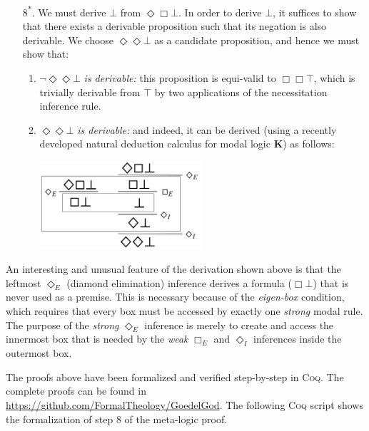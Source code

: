 \documentclass{llncs}
\newcommand{\logic}[1]{\textbf{#1}\xspace}
\newcommand{\K}{\logic{K}}
\newcommand{\Dia}{\Diamond} %
\newcommand{\nec}{\Box}
\newcommand{\pos}{\Dia}
\begin{document}
\begin{enumerate}
\item[8\textsuperscript{*}.] We must derive $\bot$ from $\pos \nec \bot$. In order to derive $\bot$, it suffices to show that there exists a derivable proposition such that its negation is also derivable. We choose $\pos \pos \bot$ as a candidate proposition, and hence we must show that:
\begin{enumerate}
\item $\neg \pos \pos \bot$ \emph{is derivable:} this proposition is equi-valid to $\nec \nec \top$, which is trivially derivable from $\top$ by two applications of the necessitation inference rule.

\item $\pos \pos \bot$ \emph{is derivable:} and indeed, it can be derived (using a recently developed natural deduction calculus for modal logic \K \cite{CSR}) as follows:
\smallskip
\begin{center}
\includegraphics[width=0.5\textwidth]{Derivation}
\end{center}
\smallskip

\end{enumerate}

\end{enumerate}

An interesting and unusual feature of the derivation shown above is that the leftmost $\pos_E$ (diamond elimination) inference derives a formula ($\nec \bot$) that is never used as a premise. This is necessary because of the \emph{eigen-box} condition, which requires that every box must be accessed by exactly one \emph{strong} modal rule. The purpose of the \emph{strong} $\pos_E$ inference is merely to create and access the innermost box that is needed by the \emph{weak} $\nec_E$ and $\pos_I$ inferences inside the outermost box.

The proofs above have been formalized and verified step-by-step in \textsc{Coq}. The complete proofs can be found in \url{https://github.com/FormalTheology/GoedelGod}. The following \textsc{Coq} script shows the formalization of step 8 of the meta-logic proof.
\end{document}
